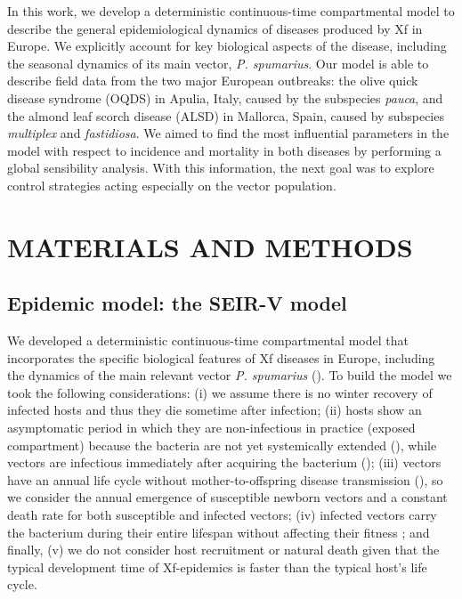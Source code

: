 In this work, we develop a deterministic continuous-time compartmental
model to describe the general epidemiological dynamics of diseases produced by
Xf in Europe. We explicitly account for key biological aspects of the disease,
including the seasonal dynamics of its main vector, \textit{P. spumarius}. Our
model is able to describe field data from the two major European outbreaks: the
olive quick disease syndrome (OQDS) in Apulia, Italy, caused by the subspecies
\textit{pauca}, and the almond leaf scorch disease (ALSD) in Mallorca, Spain,
caused by subspecies \textit{multiplex} and \textit{fastidiosa}. We aimed to
find the most influential parameters in the model with respect to incidence and
mortality in both diseases by performing a global sensibility analysis. With
this information, the next goal was to explore control strategies acting
especially on the vector population.

\section{MATERIALS AND METHODS}

\subsection{Epidemic model: the SEIR-V model}

We developed a deterministic continuous-time compartmental model that
incorporates the specific biological features of Xf diseases in Europe,
including the dynamics of the main relevant vector \textit{P. spumarius}
(\cite{ Cavalieri2019}). To build the model we took the following
considerations: (i) we assume there is no winter recovery of infected hosts and
thus they die sometime after infection; (ii) hosts show an asymptomatic period
in which they are non-infectious in practice (exposed compartment) because the
bacteria are not yet systemically extended
(\cite{teviotdale2003almond,Stevenson238}), while vectors are infectious
immediately after acquiring the bacterium (\cite{Fierro2019}); (iii) vectors
have an annual life cycle without mother-to-offspring disease transmission
(\cite{freitag1951host,purcell1979evidence}), so we consider the annual
emergence of susceptible newborn vectors and a constant death rate for both
susceptible and infected vectors; (iv) infected vectors carry the bacterium
during their entire lifespan without affecting their fitness ; and finally, (v)
we do not consider host recruitment or natural death given that the typical
development time of Xf-epidemics is faster than the typical host's life cycle.

